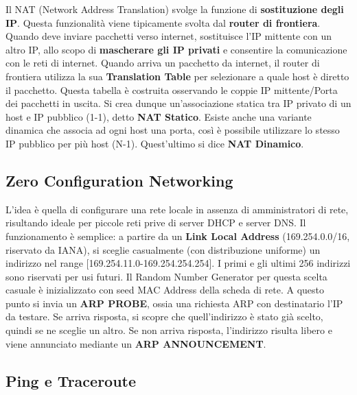 \documentclass[12pt]{article}
\begin{document}
Il NAT (Network Address Translation) svolge la funzione di \textbf{sostituzione degli IP}. Questa funzionalità viene tipicamente svolta dal \textbf{router di frontiera}. Quando deve inviare pacchetti verso internet, sostituisce l'IP mittente con un altro IP, allo scopo di \textbf{mascherare gli IP privati} e consentire la comunicazione con le reti di internet. Quando arriva un pacchetto da internet, il router di frontiera utilizza la sua \textbf{Translation Table} per selezionare a quale host è diretto il pacchetto. Questa tabella è costruita osservando le coppie IP mittente/Porta dei pacchetti in uscita. Si crea dunque un'associazione statica tra IP privato di un host e IP pubblico (1-1), detto \textbf{NAT Statico}. Esiste anche una variante dinamica che associa ad ogni host una porta, così è possibile utilizzare lo stesso IP pubblico per più host (N-1). Quest'ultimo si dice \textbf{NAT Dinamico}.

\subsection{Zero Configuration Networking}

L'idea è quella di configurare una rete locale in assenza di amministratori di rete, risultando ideale per piccole reti prive di server DHCP e server DNS. Il funzionamento è semplice: a partire da un \textbf{Link Local Address} (169.254.0.0/16, riservato da IANA), si sceglie casualmente (con distribuzione uniforme) un indirizzo nel range [169.254.11.0-169.254.254.254]. I primi e gli ultimi 256 indirizzi sono riservati per usi futuri. Il Random Number Generator per questa scelta casuale è inizializzato con seed MAC Address della scheda di rete. A questo punto si invia un \textbf{ARP PROBE}, ossia una richiesta ARP con destinatario l'IP da testare. Se arriva risposta, si scopre che quell'indirizzo è stato già scelto, quindi se ne sceglie un altro. Se non arriva risposta, l'indirizzo risulta libero e viene annunciato mediante un \textbf{ARP ANNOUNCEMENT}.

\subsection{Ping e Traceroute}
\end{document}
